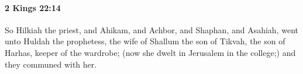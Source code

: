 
		\paragraph{2 Kings 22:14} %
			\label{2KINGS-22-14}

			So Hilkiah the priest, and Ahikam, and Achbor, and Shaphan, and Asahiah, went unto Huldah the prophetess, the wife of Shallum the son of Tikvah, the son of Harhas, keeper of the wardrobe; (now she dwelt in Jerusalem in the college;) and they communed with her.


